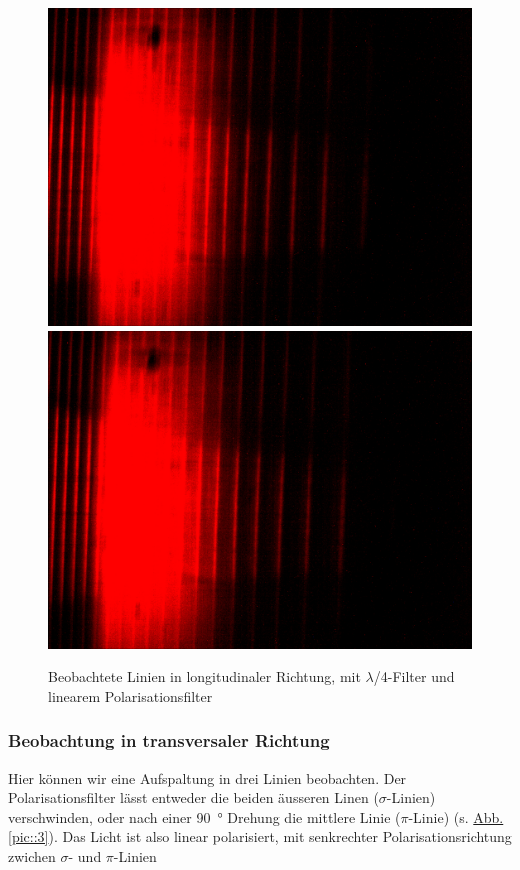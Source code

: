       \begin{figure}[H]
        \centering
        \includegraphics[width=.6\paperwidth, trim={0 650pt 0 200pt}, clip]{Auswertung/data/long/10A_2}
        \includegraphics[width=.6\paperwidth, trim={0 0 0 886pt}, clip]{Auswertung/data/long/10A_1}
        \caption{Beobachtete Linien in longitudinaler Richtung, mit $\lambda$/4-Filter und linearem Polarisationsfilter}
        \label{pic::2}
      \end{figure}
    \newpage
    \subsubsection{Beobachtung in transversaler Richtung}
      Hier können wir eine Aufspaltung in drei Linien beobachten. Der Polarisationsfilter lässt entweder die beiden äusseren Linen ($\sigma$-Linien) verschwinden, oder nach einer \SI{90}{°} Drehung die mittlere Linie ($\pi$-Linie) (s. \hyperref[pic::3]{Abb. \ref*{pic::3}}). Das Licht ist also linear polarisiert, mit senkrechter Polarisationsrichtung zwichen $\sigma$- und $\pi$-Linien

